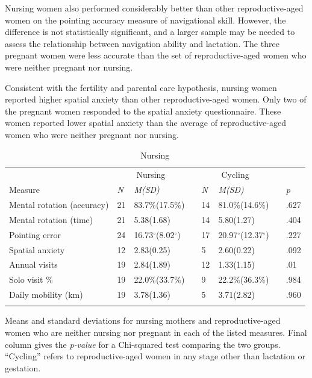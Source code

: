 Nursing women also performed considerably better than other reproductive-aged women on the pointing accuracy measure of navigational skill.  However, the difference is not statistically significant, and a larger sample may be needed to assess the relationship between navigation ability and lactation.  The three pregnant women were less accurate than the set of reproductive-aged women who were neither pregnant nor nursing. 

Consistent with the fertility and parental care hypothesis, nursing women reported higher spatial anxiety than other reproductive-aged women.  Only two of the pregnant women responded to the spatial anxiety questionnaire.  These women reported lower spatial anxiety than the average of reproductive-aged women who were neither pregnant nor nursing.

\begin{table}[h!]
\caption{Nursing}
\label{tab:lact}  
\begin{tabular}{llllllll}
\hline\noalign{\smallskip}
& \multicolumn{2}{c}{Nursing} && \multicolumn{2}{c}{Cycling} && \\
Measure & \emph{N} & \emph{M(SD)} && \emph{N} & \emph{M(SD)} && \emph{p} \\
\noalign{\smallskip}\hline\noalign{\smallskip}
Mental rotation (accuracy) & 21 & 83.7\%(17.5\%) && 14 & 81.0\%(14.6\%) && .627 \\
Mental rotation (time) & 21 & 5.38(1.68) && 14 & 5.80(1.27) && .404 \\
Pointing error & 24 & 16.73$^{\circ}$(8.02$^{\circ}$) && 17 & 20.97$^{\circ}$(12.37$^{\circ}$) && .227 \\
Spatial anxiety & 12 & 2.83(0.25) && 5 & 2.60(0.22) && .092 \\
Annual visits & 19 & 2.84(1.89) && 12 & 1.33(1.15) && .01 \\
Solo visit \% & 19 & 22.0\%(33.7\%) && 9 & 22.2\%(36.3\%) && .984 \\
Daily mobility (km) & 19 & 3.78(1.36) && 5 & 3.71(2.82) && .960 \\
\noalign{\smallskip}\hline
\end{tabular}\par
\bigskip
Means and standard deviations for nursing mothers and reproductive-aged women who are neither nursing nor pregnant in each of the listed measures. Final column gives the \emph{p-value} for a Chi-squared test comparing the two groups.  ``Cycling'' refers to reproductive-aged women in any stage other than lactation or gestation.  
\end{table}	

